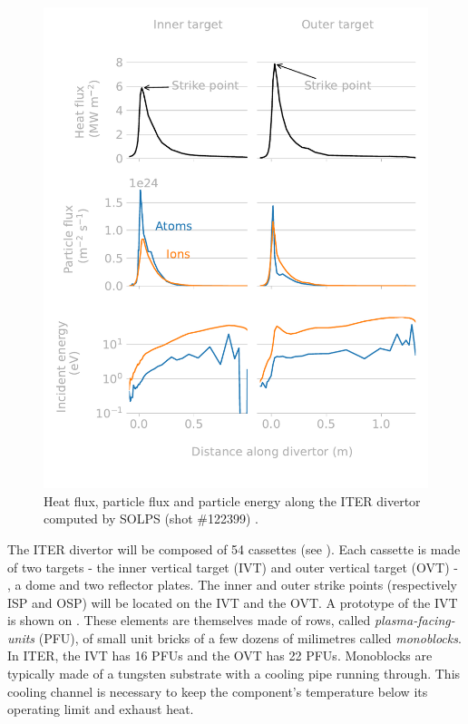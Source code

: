 \begin{figure} [h]
    \centering
    \includegraphics[width=\linewidth]{Figures/Chapter1/divertor_exposure_conditions.pdf}
    \caption{Heat flux, particle flux and particle energy along the ITER divertor computed by SOLPS (shot \#122399) \cite{pitts_physics_2019}.}
\end{figure}

The ITER divertor will be composed of 54 cassettes (see ).
Each cassette is made of two targets - the inner vertical target (IVT) and outer vertical target (OVT) - , a dome and two reflector plates.
The inner and outer strike points (respectively ISP and OSP) will be located on the IVT and the OVT.
A prototype of the IVT is shown on .
These elements are themselves made of rows, called \textit{plasma-facing-units} (PFU), of small unit bricks of a few dozens of milimetres called \textit{monoblocks}.
In ITER, the IVT has 16 PFUs and the OVT has 22 PFUs.
Monoblocks are typically made of a tungsten substrate with a cooling pipe running through.
This cooling channel is necessary to keep the component's temperature below its operating limit and exhaust heat.

